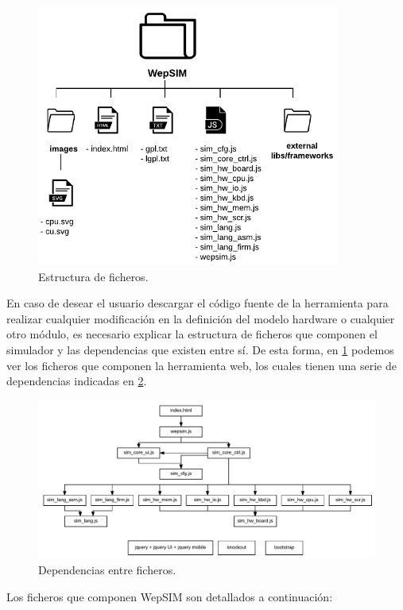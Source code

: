 \begin{figure}[htbp]
 	\centering
 	\includegraphics[width=10cm]{figures/folder_diagram}
 	\caption{Estructura de ficheros.}
	\label{fig:folder_structure}
\end{figure}

En caso de desear el usuario descargar el código fuente de la herramienta para realizar cualquier modificación en la definición del modelo hardware o cualquier otro módulo, es necesario explicar la estructura de ficheros que componen el simulador y las dependencias que existen entre sí. De esta forma, en \ref{fig:folder_structure} podemos ver los ficheros que componen la herramienta web, los cuales tienen una serie de dependencias indicadas en \ref{fig:files_dependencies}.

\begin{figure}[htbp]
 	\centering
 	\includegraphics[width=15.5cm]{figures/dependencies_diagram}
 	\caption{Dependencias entre ficheros.}
	\label{fig:files_dependencies}
\end{figure}

Los ficheros que componen WepSIM son detallados a continuación:

